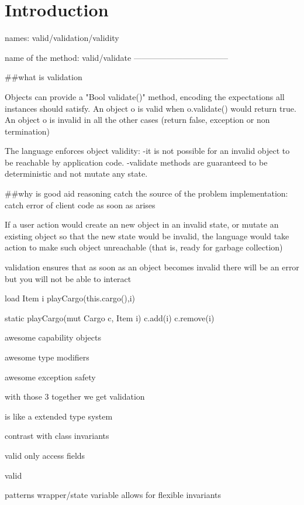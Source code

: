 
\section{Introduction}

names:
valid/validation/validity

name of the method: valid/validate
-----------------------------------

##what is validation

Objects can provide a "Bool validate()" method, encoding the expectations
all instances should satisfy.
An object o is valid when o.validate() would return true.
An object o is invalid in all the other cases (return false, exception or non termination)

The language enforces object validity:
-it is not possible for an invalid object to be reachable by application code.
-validate methods are guaranteed to be deterministic and not mutate any state.

##why is good
aid reasoning
catch the source of the problem
implementation: catch error of client code as soon as arises





If a user action would create an new object in an invalid state, or mutate an existing object so
that the new state would be invalid, the language would take action to make such object unreachable (that is, ready for garbage collection)



validation ensures that as soon as an object becomes invalid there will be an error
but you will not be able to interact 

load Item i
  playCargo(this.cargo(),i)

static playCargo(mut Cargo c, Item i)
  c.add(i)
  c.remove(i)
  
 


awesome capability objects

awesome type modifiers

awesome exception safety

with those 3 together we get validation

is like a extended type system

contrast with class invariants


valid only access fields

valid


patterns wrapper/state variable allows for flexible invariants


